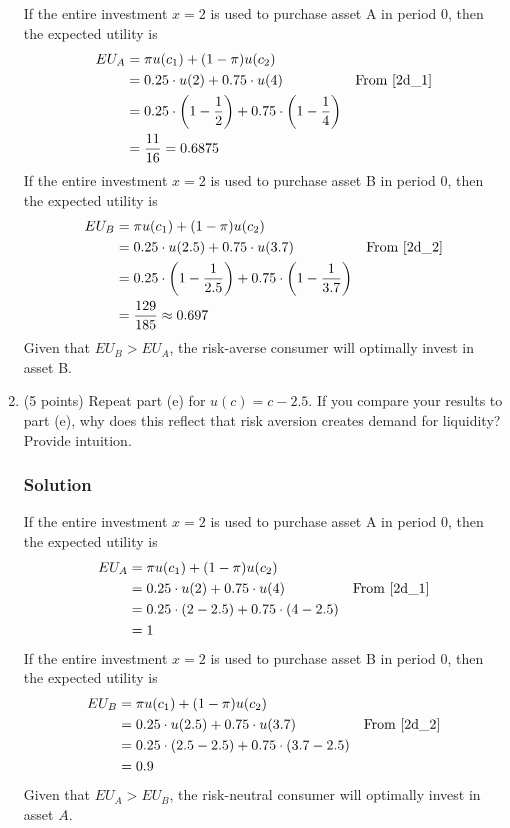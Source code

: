\documentclass[12pt]{article}
\begin{document}
\begin{enumerate}[label=(\alph*)]
    If the entire investment $x=2$ is used to purchase asset A in period 0, then the expected utility is
    \begin{align*}
        EU_A &=  \pi u(c_1) + (1-\pi) u(c_2)
        \\ &= 0.25 \cdot u(2) + 0.75 \cdot u(4) & \text{From \eqref{2d_1}}
        \\ &= 0.25 \cdot  \left(1 - \frac{1}{2}\right) + 0.75 \cdot \left(1 - \frac{1}{4}\right)
        \\ &= \frac{11}{16} = 0.6875
    \end{align*}
    If the entire investment $x=2$ is used to purchase asset B in period 0, then the expected utility  is
    \begin{align*}
        EU_B &=  \pi u(c_1) + (1-\pi) u(c_2)
        \\ &= 0.25 \cdot u(2.5) + 0.75 \cdot u(3.7) & \text{From \eqref{2d_2}}
        \\ &= 0.25 \cdot  \left(1 - \frac{1}{2.5}\right) + 0.75 \cdot \left(1 - \frac{1}{3.7}\right)
        \\ &= \frac{129}{185} \approx 0.697
    \end{align*}
    Given that $EU_B > EU_A$,  the risk-averse consumer will optimally invest in asset B.


    \item (5 points) Repeat part (e) for $u(c) = c - 2.5$. If you compare your results to part (e), why does this reflect that risk aversion creates demand for liquidity? Provide intuition.
    \subsubsection*{Solution}

     If the entire investment $x=2$ is used to purchase asset A in period 0, then the expected utility is
    \begin{align*}
        EU_A &=  \pi u(c_1) + (1-\pi) u(c_2)
        \\ &= 0.25 \cdot u(2) + 0.75 \cdot u(4) & \text{From \eqref{2d_1}}
        \\ &= 0.25 \cdot  \left(2 - 2.5\right) + 0.75 \cdot \left(4-2.5\right)
        \\ &= 1
    \end{align*}
    If the entire investment $x=2$ is used to purchase asset B in period 0, then the expected utility  is
    \begin{align*}
        EU_B &=  \pi u(c_1) + (1-\pi) u(c_2)
        \\ &= 0.25 \cdot u(2.5) + 0.75 \cdot u(3.7) & \text{From \eqref{2d_2}}
        \\ &= 0.25 \cdot  \left(2.5-2.5\right) + 0.75 \cdot \left(3.7-2.5\right)
        \\ &= 0.9
    \end{align*}
    Given that $EU_A > EU_B$,  the risk-neutral consumer will optimally invest in asset $A$.
    \end{enumerate}
\end{document}
